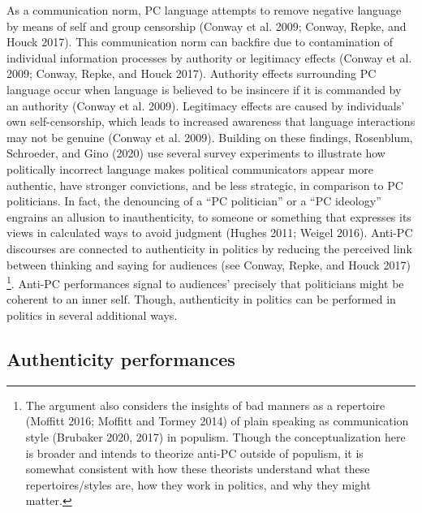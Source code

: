 \documentclass[smallextended]{svjour3}       %
\begin{document}
As a communication norm, PC language attempts to remove negative
language by means of self and group censorship (Conway et al. 2009;
Conway, Repke, and Houck 2017). This communication norm can backfire due
to contamination of individual information processes by authority or
legitimacy effects (Conway et al. 2009; Conway, Repke, and Houck 2017).
Authority effects surrounding PC language occur when language is
believed to be insincere if it is commanded by an authority (Conway et
al. 2009). Legitimacy effects are caused by individuals' own
self-censorship, which leads to increased awareness that language
interactions may not be genuine (Conway et al. 2009). Building on these
findings, Rosenblum, Schroeder, and Gino (2020) use several survey
experiments to illustrate how politically incorrect language makes
political communicators appear more authentic, have stronger
convictions, and be less strategic, in comparison to PC politicians. In
fact, the denouncing of a ``PC politician'' or a ``PC ideology''
engrains an allusion to inauthenticity, to someone or something that
expresses its views in calculated ways to avoid judgment (Hughes 2011;
Weigel 2016). Anti-PC discourses are connected to authenticity in
politics by reducing the perceived link between thinking and saying for
audiences (see Conway, Repke, and Houck 2017) \footnote{ The argument
  also considers the insights of bad manners as a repertoire (Moffitt
  2016; Moffitt and Tormey 2014) of plain speaking as communication
  style (Brubaker 2020, 2017) in populism. Though the conceptualization
  here is broader and intends to theorize anti-PC outside of populism,
  it is somewhat consistent with how these theorists understand what
  these repertoires/styles are, how they work in politics, and why they
  might matter.}. Anti-PC performances signal to audiences' precisely
that politicians might be coherent to an inner self. Though,
authenticity in politics can be performed in politics in several
additional ways.

\hypertarget{authenticity-performances}{%
\subsection{Authenticity performances}\label{authenticity-performances}}
\end{document}
